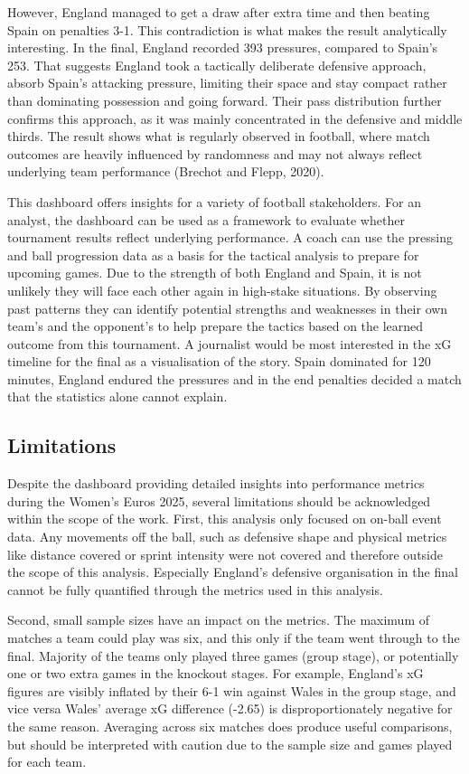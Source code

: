 \documentclass[
  11pt,
  a4paper,
  DIV=11,
  numbers=noendperiod]{scrartcl}
\begin{document}
However, England managed to get a draw after extra time and then beating
Spain on penalties 3-1. This contradiction is what makes the result
analytically interesting. In the final, England recorded 393 pressures,
compared to Spain's 253. That suggests England took a tactically
deliberate defensive approach, absorb Spain's attacking pressure,
limiting their space and stay compact rather than dominating possession
and going forward. Their pass distribution further confirms this
approach, as it was mainly concentrated in the defensive and middle
thirds. The result shows what is regularly observed in football, where
match outcomes are heavily influenced by randomness and may not always
reflect underlying team performance (Brechot and Flepp, 2020).

This dashboard offers insights for a variety of football stakeholders.
For an analyst, the dashboard can be used as a framework to evaluate
whether tournament results reflect underlying performance. A coach can
use the pressing and ball progression data as a basis for the tactical
analysis to prepare for upcoming games. Due to the strength of both
England and Spain, it is not unlikely they will face each other again in
high-stake situations. By observing past patterns they can identify
potential strengths and weaknesses in their own team's and the
opponent's to help prepare the tactics based on the learned outcome from
this tournament. A journalist would be most interested in the xG
timeline for the final as a visualisation of the story. Spain dominated
for 120 minutes, England endured the pressures and in the end penalties
decided a match that the statistics alone cannot explain.

\subsection{Limitations}\label{limitations}

Despite the dashboard providing detailed insights into performance
metrics during the Women's Euros 2025, several limitations should be
acknowledged within the scope of the work. First, this analysis only
focused on on-ball event data. Any movements off the ball, such as
defensive shape and physical metrics like distance covered or sprint
intensity were not covered and therefore outside the scope of this
analysis. Especially England's defensive organisation in the final
cannot be fully quantified through the metrics used in this analysis.

Second, small sample sizes have an impact on the metrics. The maximum of
matches a team could play was six, and this only if the team went
through to the final. Majority of the teams only played three games
(group stage), or potentially one or two extra games in the knockout
stages. For example, England's xG figures are visibly inflated by their
6-1 win against Wales in the group stage, and vice versa Wales' average
xG difference (-2.65) is disproportionately negative for the same
reason. Averaging across six matches does produce useful comparisons,
but should be interpreted with caution due to the sample size and games
played for each team.
\end{document}

